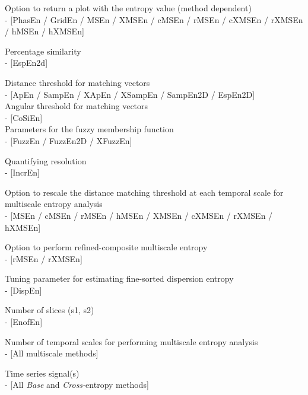\documentclass[12pt, a4paper, titlepage, openany]{book}
\begin{document}
\begin{description}[labelsep=1cm, labelwidth=2cm, nosep, style=multiline,leftmargin=3cm]
\item[\texttt{Plotx}]		Option to return a plot with the entropy value (method dependent) \\
 - [PhasEn / GridEn / MSEn / XMSEn / cMSEn / rMSEn / cXMSEn / rXMSEn / hMSEn / hXMSEn]\\
\item[\texttt{ps}]		Percentage similarity \\  - [EspEn2d]\\
\item[\texttt{r}]		Distance threshold for matching vectors \\  - [ApEn / SampEn / XApEn / XSampEn / SampEn2D / EspEn2D]\\
 Angular threshold for matching vectors \\  - [CoSiEn]\\
 Parameters for the fuzzy membership function \\ - [FuzzEn / FuzzEn2D / XFuzzEn] \\
\item[\texttt{R}]		Quantifying resolution \\  - [IncrEn]\\
\item[\texttt{RadNew}]		Option to rescale the distance matching threshold at each temporal scale for multiscale entropy analysis \\  - [MSEn / cMSEn / rMSEn / hMSEn / XMSEn / cXMSEn / rXMSEn / hXMSEn]\\
\item[\texttt{Refined}]		Option to perform refined-composite multiscale entropy \\  - [rMSEn / rXMSEn]\\
\item[\texttt{rho}]		Tuning parameter for estimating fine-sorted dispersion entropy \\  - [DispEn]\\
\item[\texttt{S}]		Number of slices (s1, s2) \\  - [EnofEn]\\
\item[\texttt{Scales}]		Number of temporal scales for performing multiscale entropy analysis \\  - [All multiscale methods]\\
\item[\texttt{Sig}]		Time series signal(s) \\ - [All \textit{Base} and \textit{Cross-}entropy methods]\\

\end{description}
\end{document}
